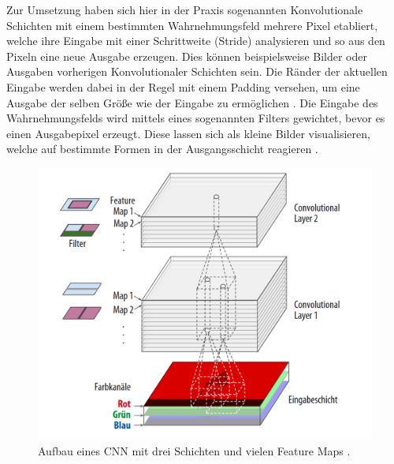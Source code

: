 \documentclass[twoside,a4paper]{IEEEtran}
\begin{document}
Zur Umsetzung haben sich hier in der Praxis sogenannten Konvolutionale Schichten mit einem bestimmten Wahrnehmungsfeld mehrere Pixel etabliert, welche  ihre Eingabe mit einer Schrittweite (Stride) analysieren und so aus den Pixeln eine neue Ausgabe erzeugen. Dies können beispielsweise Bilder oder Ausgaben vorherigen Konvolutionaler Schichten sein. Die Ränder der aktuellen Eingabe werden dabei in der Regel mit einem Padding versehen, um eine Ausgabe der selben Größe wie der Eingabe zu ermöglichen \cite[S.361-363]{MACHINE_LEARNING}. Die Eingabe des Wahrnehmungsfelds wird mittels eines sogenannten Filters gewichtet, bevor es einen Ausgabepixel erzeugt. Diese lassen sich als kleine Bilder visualisieren, welche auf bestimmte Formen in der Ausgangsschicht reagieren \cite[S.363]{MACHINE_LEARNING}. 

\begin{figure}[!htb]
	\includegraphics[width=\columnwidth]{cnn_example}
	\caption{Aufbau eines CNN mit drei Schichten und vielen Feature Maps \cite[S.365]{MACHINE_LEARNING}.}
	\label{bild1}
\end{figure}
\end{document}
